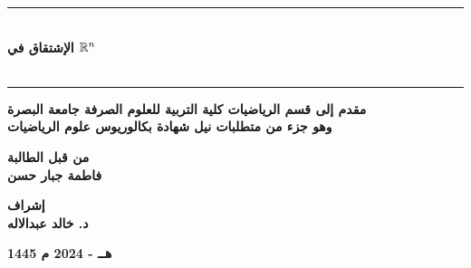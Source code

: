 \begin{titlepage}
\vspace{1cm}

\begin{center}
\rule{100mm}{0.5mm}\\
    \vspace{1cm}
    \large \textbf{الإشتقاق في $\mathbb{R}^n$}\\
    \large \textbf{}\\
    \vspace{12pt}
    \rule{100mm}{0.5mm}
\end{center}
\vfill
\begin{center}
    \textbf{مقدم إلى قسم الرياضيات كلية التربية للعلوم الصرفة جامعة البصرة\\
    \vspace{6pt}
    وهو جزء من متطلبات نيل شهادة بكالوريوس علوم الرياضيات}
\end{center}
\vfill
\begin{center}
    \textbf{من قبل الطالبة}\\
    \vspace{8pt}
    \textbf{فاطمة جبار حسن}
\end{center}
\vspace{10pt}
\begin{center}
    \textbf{إشراف}\\
    \vspace{8pt}
   \textbf{د. خالد عبدالاله}
\end{center}
\vspace{10pt}
\begin{center}
  \textbf{1445 ه‍ــ - 2024 م}
\end{center}
\end{titlepage}
